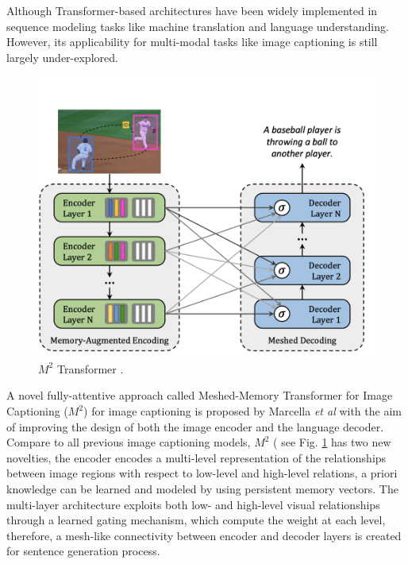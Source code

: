 \documentclass[
]{krantz}
\begin{document}
Although Transformer-based architectures have been widely implemented in sequence modeling tasks like machine translation and language understanding. However, its applicability for multi-modal tasks like image captioning is still largely under-explored. \citep{cornia2020m2}



\begin{figure}

{\centering \includegraphics[width=1\linewidth]{figures/02-01/2.2 m2arc1} 

}

\caption{\(M^2\) Transformer \citep{cornia2020m2}.}\label{fig:m2arc1}
\end{figure}

A novel fully-attentive approach called Meshed-Memory Transformer for Image Captioning (\(M^2\)) for image captioning is proposed by Marcella \emph{et al}\citep{cornia2020m2} with the aim of improving the design of both the image encoder and the language decoder. Compare to all previous image captioning models, \(M^2\) ( see Fig. \ref{fig:m2arc1} has two new novelties, the encoder encodes a multi-level representation of the relationships between image regions with respect to low-level and high-level relations, a priori knowledge can be learned and modeled by using persistent memory vectors. The multi-layer architecture exploits both low- and high-level visual relationships through a learned gating mechanism, which compute the weight at each level, therefore, a mesh-like connectivity between encoder and decoder layers is created for sentence generation process.\citep{cornia2020m2}
\end{document}
